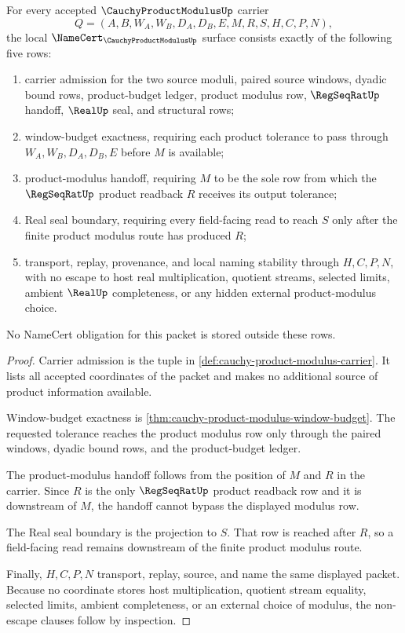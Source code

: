 \begin{theorem}
\label{thm:cauchy-product-modulus-namecert-obligations}
For every accepted $\CauchyProductModulusUp$ carrier
$$
Q=(A,B,W_A,W_B,D_A,D_B,E,M,R,S,H,C,P,N),
$$
the local $\NameCert_{\CauchyProductModulusUp}$ surface consists exactly of the following five rows:
\begin{enumerate}
\item carrier admission for the two source moduli, paired source windows, dyadic bound rows, product-budget ledger, product modulus row, $\RegSeqRatUp$ handoff, $\RealUp$ seal, and structural rows;
\item window-budget exactness, requiring each product tolerance to pass through $W_A,W_B,D_A,D_B,E$ before $M$ is available;
\item product-modulus handoff, requiring $M$ to be the sole row from which the $\RegSeqRatUp$ product readback $R$ receives its output tolerance;
\item Real seal boundary, requiring every field-facing read to reach $S$ only after the finite product modulus route has produced $R$;
\item transport, replay, provenance, and local naming stability through $H,C,P,N$, with no escape to host real multiplication, quotient streams, selected limits, ambient $\RealUp$ completeness, or any hidden external product-modulus choice.
\end{enumerate}
No NameCert obligation for this packet is stored outside these rows.
\end{theorem}
\begin{proof}
Carrier admission is the tuple in \autoref{def:cauchy-product-modulus-carrier}. It lists all accepted coordinates of the packet and makes no additional source of product information available.

Window-budget exactness is \autoref{thm:cauchy-product-modulus-window-budget}. The requested tolerance reaches the product modulus row only through the paired windows, dyadic bound rows, and the product-budget ledger.

The product-modulus handoff follows from the position of $M$ and $R$ in the carrier. Since $R$ is the only $\RegSeqRatUp$ product readback row and it is downstream of $M$, the handoff cannot bypass the displayed modulus row.

The Real seal boundary is the projection to $S$. That row is reached after $R$, so a field-facing read remains downstream of the finite product modulus route.

Finally, $H,C,P,N$ transport, replay, source, and name the same displayed packet. Because no coordinate stores host multiplication, quotient stream equality, selected limits, ambient completeness, or an external choice of modulus, the non-escape clauses follow by inspection.
\end{proof}

